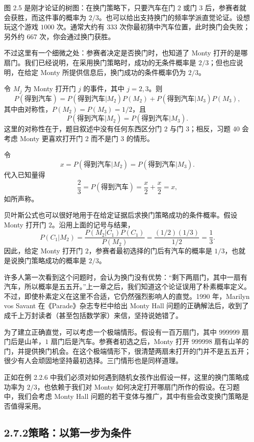 \documentclass[UTF8,12pt,a4paper,fontset=fandol]{ctexart}
\begin{document}
图 2.5 是刚才论证的树图：在换门策略下，只要汽车在门 $2$ 或门 $3$ 后，参赛者就会获胜，而这件事的概率为 $2/3$。也可以给出支持换门的频率学派直觉论证。设想玩这个游戏 $1000$ 次。通常大约有 $333$ 次你最初猜中汽车位置，此时换门会失败；另外约 $667$ 次，你会通过换门获胜。

不过这里有一个细微之处：参赛者决定是否换门时，也知道了 Monty 打开的是哪扇门。我们已经说明，在采用换门策略时，成功的无条件概率是 $2/3$；但也应说明，在给定 Monty 所提供信息后，换门成功的条件概率仍为 $2/3$。

令 $M_j$ 为 Monty 打开门 $j$ 的事件，其中 $j=2,3$。则
\[
  P(\text{得到汽车})
  =
  P(\text{得到汽车}|M_2)P(M_2)
  +
  P(\text{得到汽车}|M_3)P(M_3),
\]
其中由对称性，$P(M_2)=P(M_3)=1/2$，且
\[
  P(\text{得到汽车}|M_2)=P(\text{得到汽车}|M_3).
\]
这里的对称性在于，题目叙述中没有任何东西区分门 $2$ 与门 $3$；相反，习题 40 会考虑 Monty 更喜欢打开门 $2$ 而不是门 $3$ 的情形。

令
\[
  x=P(\text{得到汽车}|M_2)=P(\text{得到汽车}|M_3).
\]
代入已知量得
\[
  \frac23=P(\text{得到汽车})=\frac{x}{2}+\frac{x}{2}=x,
\]
如所声称。

贝叶斯公式也可以很好地用于在给定证据后求换门策略成功的条件概率。假设 Monty 打开门 $2$。沿用上面的记号与结果，
\[
  P(C_1|M_2)=
  \frac{P(M_2|C_1)P(C_1)}{P(M_2)}
  =
  \frac{(1/2)(1/3)}{1/2}
  =
  \frac13.
\]
因此，给定 Monty 打开门 $2$，参赛者最初选择的门后有汽车的概率是 $1/3$，也就是说换门策略成功的概率是 $2/3$。

许多人第一次看到这个问题时，会认为换门没有优势：“剩下两扇门，其中一扇有汽车，所以概率是五五开。”上一章之后，我们知道这个论证误用了朴素概率定义。不过，即使朴素定义在这里不合适，它仍然强烈影响人的直觉。1990 年，Marilyn vos Savant 在《Parade》杂志专栏中给出 Monty Hall 问题的正确解法后，收到了成千上万封读者（甚至包括数学家）来信，坚持说她错了。

为了建立正确直觉，可以考虑一个极端情形。假设有一百万扇门，其中 $999999$ 扇门后是山羊，$1$ 扇门后是汽车。参赛者初选之后，Monty 打开 $999998$ 扇有山羊的门，并提供换门机会。在这个极端情形下，很清楚两扇未打开的门并不是五五开；很少有人会顽固地坚持最初选择。三门情形也是同样道理。

正如在例 2.2.6 中我们必须对如何遇到随机女孩作出假设一样，这里的换门策略成功率为 $2/3$，也依赖于我们对 Monty 如何决定打开哪扇门所作的假设。在习题中，我们会考虑 Monty Hall 问题的若干变体与推广，其中有些会改变换门策略是否值得采用。

\subsection*{2.7.2\quad 策略：以第一步为条件}
\end{document}
